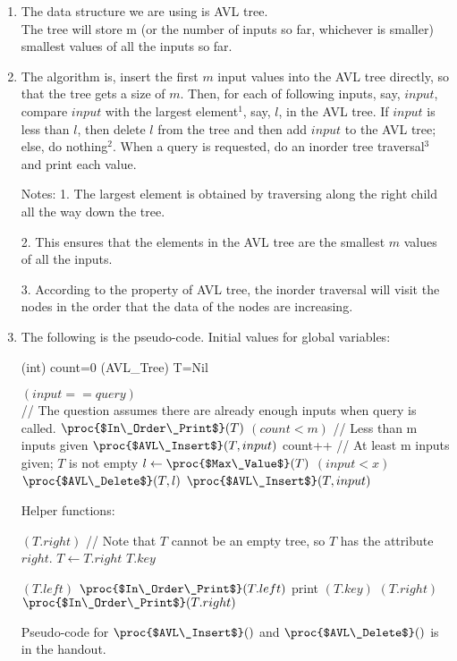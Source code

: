 \documentclass[11pt, answers]{exam}
\theoremstyle{plain}
\theoremstyle{definition}
\begin{document}
\begin{questions}
\question
\begin{solution}
\begin{enumerate}
\item The data structure we are using is AVL tree. \\
The tree will store m (or the number of inputs so far, whichever is smaller) smallest values of all the inputs so far.

\item The algorithm is, insert the first $m$ input values into the AVL tree directly, so that the tree gets a size of $m$. Then, for each of following inputs, say, $input$, compare $input$ with the largest element$^1$, say, $l$, in the AVL tree. If $input$ is less than $l$, then delete $l$ from the tree and then add $input$ to the AVL tree; else, do nothing$^2$. When a query is requested, do an inorder tree traversal$^3$ and print each value.

Notes: 
1. The largest element is obtained by traversing along the right child all the way down the tree.

2. This ensures that the elements in the AVL tree are the smallest $m$ values of all the inputs. 

3.  According to the property of AVL tree, the inorder traversal will visit the nodes in the order that the data of the nodes are increasing.

\item The following is the pseudo-code.
Initial values for global variables:
\begin{codebox}
\li (int) count=0
\li (AVL\_Tree) T=Nil
\end{codebox}

\begin{codebox}
\li \If $(input == query)$ \\// The question assumes there are already enough inputs when query is called.
\li     \Then $\proc{$In\_Order\_Print$}(T)$
\li     \Else
\li     \If $(count < m)$ // Less than m inputs given
\li         \Then $\proc{$AVL\_Insert$}(T, input)$
\li         count++
\li     \Else // At least m inputs given; $T$ is not empty
\li         $l \gets \proc{$Max\_Value$}(T)$
\li         \If $(input<x)$
\li             \Then $\proc{$AVL\_Delete$}(T, l)$
\li             $\proc{$AVL\_Insert$}(T, input)$
\end{codebox}
Helper functions:
\begin{codebox}
\li \While $(T.right)$ // Note that $T$ cannot be an empty tree, so $T$ has the attribute $right$.
\li     \Do $T \gets T.right$ \End
\li \Return $T.key$
\end{codebox}
\begin{codebox}
\li \If $(T.left)$
\li     \Then $\proc{$In\_Order\_Print$}(T.left)$ \End
\li print $(T.key)$
\li \If $(T.right)$
\li     \Then $\proc{$In\_Order\_Print$}(T.right)$ \End
\end{codebox}
Pseudo-code for $\proc{$AVL\_Insert$}()$ and $\proc{$AVL\_Delete$}()$ is in the handout.


\end{enumerate}
\end{solution}
\end{questions}
\end{document}
